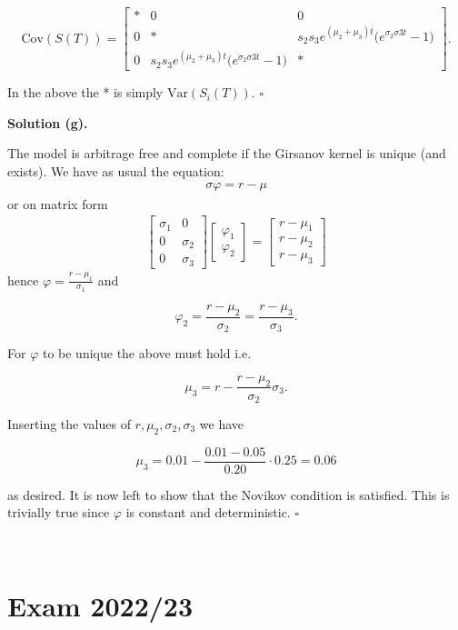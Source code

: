 \documentclass[a4paper,12pt,openany]{book}
\begin{document}
\[
\text{Cov}(S(T))=
\begin{bmatrix}
* & 0 & 0\\
0 & * & s_2s_3e^{(\mu_2+\mu_3)t}\Big(e^{\sigma_2\sigma3t}-1\Big)\\
0 & s_2s_3e^{(\mu_2+\mu_3)t}\Big(e^{\sigma_2\sigma3t}-1\Big) & *
\end{bmatrix}.
\]

In the above the * is simply \(\text{Var}(S_i(T))\). \(\square\)

\noindent\makebox[\linewidth]{\rule{\textwidth}{0.4pt}}

\textbf{Solution (g).}

The model is arbitrage free and complete if the Girsanov kernel is unique (and exists). We have as usual the equation:
\begin{align*}
\sigma \varphi=r-\mu
\end{align*}
or on matrix form
\begin{align*}
\begin{bmatrix}
\sigma_1 & 0\\
0 & \sigma_2\\
0 & \sigma_3
\end{bmatrix}
\begin{bmatrix}
\varphi_1\\
\varphi_2
\end{bmatrix}=
\begin{bmatrix}
r- \mu_1 \\
r- \mu_2\\
r-\mu_3
\end{bmatrix}
\end{align*}
hence \(\varphi =\frac{r-\mu_1}{\sigma_1}\) and

\[
\varphi_2=\frac{r-\mu_2}{\sigma_2}=\frac{r-\mu_3}{\sigma_3}.
\]

For \(\varphi\) to be unique the above must hold i.e.

\[
\mu_3=r-\frac{r-\mu_2}{\sigma_2}\sigma_3.
\]

Inserting the values of \(r,\mu_2,\sigma_2,\sigma_3\) we have

\[
\mu_3=0.01-\frac{0.01-0.05}{0.20}\cdot 0.25=0.06
\]

as desired. It is now left to show that the Novikov condition is satisfied. This is trivially true since \(\varphi\) is constant and deterministic. \(\square\)

\noindent\makebox[\linewidth]{\rule{\textwidth}{0.4pt}}\\
\pagebreak

\hypertarget{exam-202223}{%
\section{Exam 2022/23}\label{exam-202223}}
\end{document}
